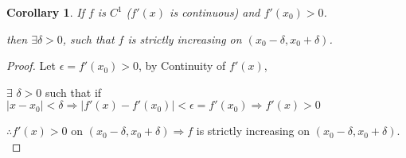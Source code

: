 \documentclass[12pt]{article}
\newcommand{\abs}[1]{\left| #1 \right|}
\theoremstyle{plain}
\newtheorem{corollary}{Corollary}[subsection]
\begin{document}
    \begin{corollary}
        If $f$ is $C^1$ ($f'(x)$ is continuous) and $f'(x_0)> 0$. 

        then $\exists \delta > 0$, such that $f$ is strictly increasing
        on $(x_0 - \delta, x_0+\delta)$.
    \end{corollary}
    \begin{proof}
        Let $\epsilon = f'(x_0) > 0$, by Continuity of $f'(x)$, 

        $\exists\,\, \delta >0$ such that if $\abs{x-x_0}<\delta \Rightarrow
        \abs{f'(x) -f'(x_0)} < \epsilon =f'(x_0) \Rightarrow f'(x)>0$

        $\therefore f'(x) > 0$ on $(x_0-\delta, x_0+\delta) \Rightarrow
        f$ is strictly increasing on $(x_0-\delta, x_0+\delta)$. \\
    \end{proof}
    
\end{document}
